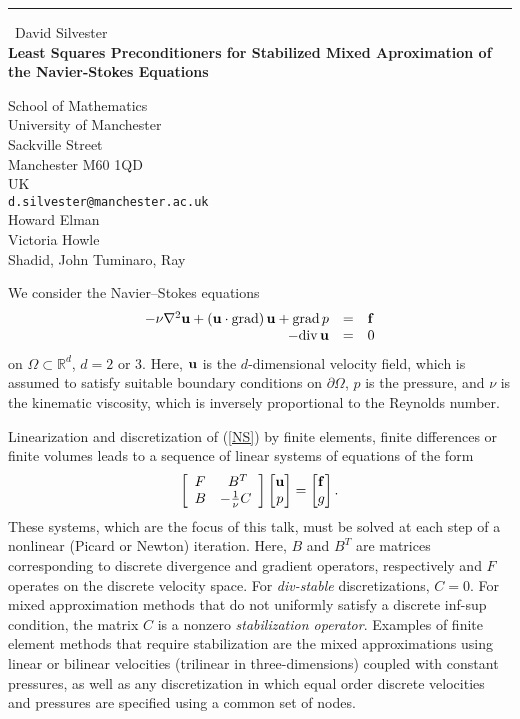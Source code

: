 \documentclass{report}
\begin{document}
\begin{center}
\rule{6in}{1pt} \
{\large David Silvester \\
{\bf Least Squares Preconditioners for Stabilized Mixed Aproximation of the Navier-Stokes Equations }}

School of Mathematics \\ University of Manchester \\ Sackville Street \\ Manchester M60 1QD \\ UK
\\
{\tt d.silvester@manchester.ac.uk}\\
Howard Elman\\
Victoria Howle\\
	Shadid, John
	Tuminaro, Ray\end{center}

We consider the Navier--Stokes equations
\begin{equation} \label{NS}
\begin{array}{rcl}
-\nu \nabla^2 {\bf u}
+ ({\bf u} \cdot {\rm grad})\, {\bf u} +
{\rm grad}\, p &= &{\bf f} \\
-{\rm div}\, {\bf u} &= &0
\end{array}
\end{equation}
on $\Omega \subset \mathbb{R}^d$, $d=2$ or $3$. Here, ${\bf u}$
is the $d$-dimensional velocity field, which is assumed to satisfy
suitable boundary conditions on $\partial \Omega$, $p$ is the
pressure, and $\nu$ is the kinematic viscosity, which is
inversely proportional to the Reynolds number.

Linearization and discretization of (\ref{NS}) by finite elements, finite
differences or finite volumes leads to a sequence of linear systems of
equations of the form
\begin{equation} \label{NSdiscretelinearStabilized}
\left[
\begin{array}{lc}
F & \ B^T \\ B & -\frac{1}{\nu}C
\end{array}
\right]
\begin{bmatrix}
{\bf u}\\ p
\end{bmatrix}
=
\begin{bmatrix}
{\bf f}\\ g
\end{bmatrix}.
\end{equation}
These systems, which are the focus of this talk, must be solved
at each step of a nonlinear (Picard or Newton) iteration. Here, $B$ and
$B^T$ are matrices corresponding to discrete divergence and gradient
operators, respectively and $F$ operates on the discrete velocity space.
For {\em div-stable} discretizations, $C=0$. For mixed approximation
methods that do not
uniformly satisfy a discrete inf-sup condition, the matrix $C$ is
a nonzero {\em stabilization operator}.
Examples of finite element methods that require stabilization are
the mixed approximations using linear or bilinear velocities
(trilinear in three-dimensions) coupled with constant pressures,
as well as any discretization in which equal order discrete velocities and
pressures are specified using a common set of nodes.
\end{document}
